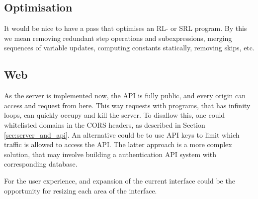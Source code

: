 \subsection{Optimisation}
It would be nice to have a pass that optimises an RL- or SRL program. By this we mean removing redundant step operations and subexpressions, merging sequences of variable updates, computing constants statically, removing skips, etc.

\subsection{Web}
As the server is implemented now, the API is fully public, and every origin can access and request from here. This way requests with programs, that has infinity loops, can quickly occupy and kill the server. To disallow this, one could whitelisted domains in the CORS headers, as described in Section \ref{sec:server_and_api}. An alternative could be to use API keys to limit which traffic is allowed to access the API. The latter approach is a more complex solution, that may involve building a authentication API system with corresponding database.

For the user experience, and expansion of the current interface could be the opportunity for resizing each area of the interface.
